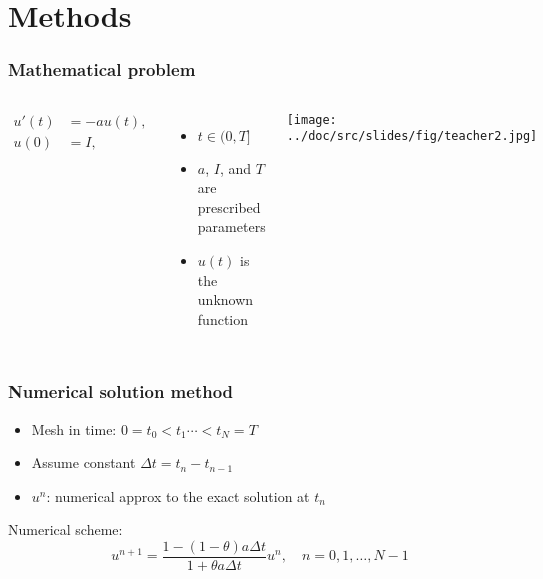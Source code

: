 \documentclass{beamer}
\begin{document}
\section{Methods}

\begin{frame}
\frametitle{Mathematical problem}

\begin{columns}
\begin{align}
u'(t) &= -au(t),
\label{ode}\\ 
u(0)  &= I,
\label{initial:value}
\end{align}

\begin{itemize}
 \item $t\in (0,T]$

 \item $a$, $I$, and $T$ are prescribed parameters

 \item $u(t)$ is the unknown function
\end{itemize}

\noindent

\vspace{6mm}

\centerline{\texttt{[image: ../doc/src/slides/fig/teacher2.jpg]}}

\vspace{6mm}


\end{columns}
\end{frame}

\begin{frame}
\frametitle{Numerical solution method}

\begin{itemize}
\pause
 \item Mesh in time: $0= t_0< t_1 \cdots < t_N=T$

\pause
 \item Assume constant $\Delta t = t_{n}-t_{n-1}$

\pause
 \item $u^n$: numerical approx to the exact solution at $t_n$
\end{itemize}

\noindent

\pause
Numerical scheme:
   \[
   u^{n+1} = \frac{1 - (1-\theta) a\Delta t}{1 + \theta a\Delta t}u^n,
   \quad n=0,1,\ldots,N-1
   \]
\end{frame}
\end{document}
